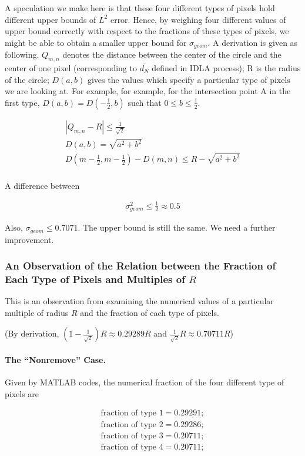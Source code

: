\documentclass[letterpaper]{article}
\numberwithin{equation}{section} %
\numberwithin{figure}{section} %
\numberwithin{table}{section} %
\begin{document}
A speculation we make here is that these four different types of pixels hold different upper bounds of $L^2$ error. Hence, by weighing four different values of upper bound correctly with respect to the fractions of these types of pixels, we might be able to obtain a smaller upper bound for $\sigma_{geom}$. A derivation is given as following. $Q_{m,n}$ denotes the distance between the center of the circle and the center of one pixel (corresponding to $\overline{d_N}$ defined in IDLA process); R is the radius of the circle; $D(a,b)$ gives the values which specify a particular type of pixels we are looking at. For example, for example, for the intersection point A in the first type, $D(a,b)=D(-\frac{1}{2},b)$ such that $0\leq b \leq \frac{1}{2}$.

\begin{align} 
|Q_{m,n}-R| \leq \frac{1}{\sqrt{2}} \\
D(a,b) = \sqrt{a^2+b^2} \\
D(m-\frac{1}{2},m-\frac{1}{2})-D(m,n)\leq R-\sqrt{a^2+b^2} \\
\end{align}

\noindent
A difference between 

\begin{align} 
\sigma_{geom}^2 \leq \frac{1}{2} \approx 0.5
\end{align}

Also, $\sigma_{geom} \leq 0.7071$. The upper bound is still the same. We need a further improvement.

\subsubsection{An Observation of the Relation between the Fraction of Each Type of Pixels and Multiples of $R$}

This is an observation from examining the numerical values of a particular multiple of radius $R$ and the fraction of each type of pixels. 

(By derivation, $(1-\frac{1}{\sqrt{2}})R \approx 0.29289 R$ and $\frac{1}{\sqrt{2}}R \approx 0.70711 R$)

\paragraph{The \enquote{Nonremove} Case.}
Given by MATLAB codes, the numerical fraction of the four different type of pixels are 

\begin{align} 
\text{fraction of type 1}=0.29291; \\
\text{fraction of type 2}=0.29286; \\
\text{fraction of type 3}=0.20711; \\
\text{fraction of type 4}=0.20711; 
\end{align}
\end{document}
